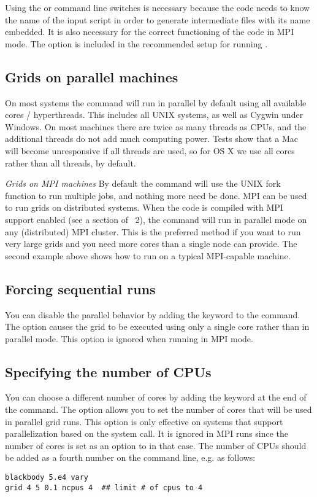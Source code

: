 Using the  or  command line switches is
necessary because the code needs to know the name of the input script in order
to generate intermediate files with its name embedded. It is also necessary
for the correct functioning of the code in MPI mode.
The  option is included in the recommended setup for
running \Cloudy.

\subsection{Grids on parallel machines}

On most systems the  command will run in parallel by default using all
available cores / hyperthreads. This includes all UNIX systems, as
well as Cygwin under Windows.
On most machines there are twice as many threads as CPUs, and the
additional threads do not add much computing power.
Tests show that a Mac will become unresponsive if all threads are used, so for OS X
we use all cores rather than all threads, by default.

\emph{Grids on MPI machines}
By default the  command will use the UNIX fork function to 
run multiple jobs, and nothing more need be done.
MPI can be used to run grids on distributed systems.
When the code is
compiled with MPI support enabled (see a section of \Hazy~2),
the  command will run
in parallel mode on any (distributed) MPI cluster. This is the preferred method if you
want to run very large grids and you need more cores than a single node can provide.
The second example above shows how to run on a typical MPI-capable machine.

\subsection{Forcing sequential runs}
You can disable the parallel behavior by adding
the keyword  to the  command. 
The  option causes the grid to be executed using only a
single core rather than in parallel mode. This option is ignored when running
in MPI mode.

\subsection{Specifying the number of CPUs}
You can
choose a different number of cores by adding the keyword 
at the end of the  command. 
The  option allows you to set the number of cores that will
be used in parallel grid runs. This option is only effective on systems that
support parallelization based on the  system call. It is
ignored in MPI runs since the number of cores is set as an option to
 in that case. 
The number of CPUs should be added as a fourth number on
the command line, e.g. as follows:
\begin{verbatim}
blackbody 5.e4 vary
grid 4 5 0.1 ncpus 4  ## limit # of cpus to 4
\end{verbatim}

